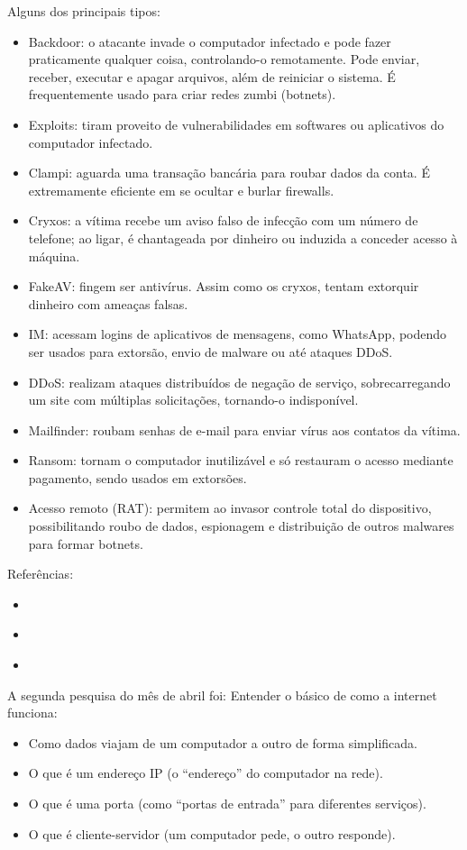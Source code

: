 	Alguns dos principais tipos:
	\begin{itemize}
		\item Backdoor: o atacante invade o computador infectado e pode fazer praticamente qualquer coisa, controlando-o remotamente. Pode enviar, receber, executar e apagar arquivos, além de reiniciar o sistema. É frequentemente usado para criar redes zumbi (botnets).
		\item Exploits: tiram proveito de vulnerabilidades em softwares ou aplicativos do computador infectado.
		\item Clampi: aguarda uma transação bancária para roubar dados da conta. É extremamente eficiente em se ocultar e burlar firewalls.
		\item Cryxos: a vítima recebe um aviso falso de infecção com um número de telefone; ao ligar, é chantageada por dinheiro ou induzida a conceder acesso à máquina.
		\item FakeAV: fingem ser antivírus. Assim como os cryxos, tentam extorquir dinheiro com ameaças falsas.
		\item IM: acessam logins de aplicativos de mensagens, como WhatsApp, podendo ser usados para extorsão, envio de malware ou até ataques DDoS.
		\item DDoS: realizam ataques distribuídos de negação de serviço, sobrecarregando um site com múltiplas solicitações, tornando-o indisponível.
		\item Mailfinder: roubam senhas de e-mail para enviar vírus aos contatos da vítima.
		\item Ransom: tornam o computador inutilizável e só restauram o acesso mediante pagamento, sendo usados em extorsões.
		\item Acesso remoto (RAT): permitem ao invasor controle total do dispositivo, possibilitando roubo de dados, espionagem e distribuição de outros malwares para formar botnets.
	\end{itemize}
	
	Referências:
	\begin{itemize}
		\item \cite{eset}
		\item \cite{wiki1}
		\item \cite{kaspersky_trojan}
	\end{itemize}
	
	A segunda pesquisa do mês de abril foi: Entender o básico de como a internet funciona:
	\begin{itemize}
		\item Como dados viajam de um computador a outro de forma simplificada.
		\item O que é um endereço IP (o ``endereço'' do computador na rede).
		\item O que é uma porta (como ``portas de entrada'' para diferentes serviços).
		\item O que é cliente-servidor (um computador pede, o outro responde).
	\end{itemize}
	
